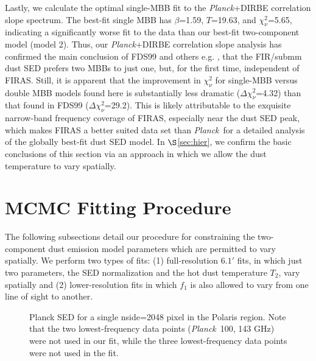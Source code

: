 \documentclass{emulateapj}
\newcommand{\PLANCK}{{\it Planck}}
\begin{document}
Lastly, we calculate the optimal single-MBB fit to the \PLANCK+DIRBE 
correlation slope spectrum. The best-fit single MBB has $\beta$=1.59, 
$T$=19.63, and $\chi^2_{\nu}$=5.65, indicating a significantly worse fit to the
data than our best-fit two-component model (model 2). Thus, our \PLANCK+DIRBE 
correlation slope analysis has confirmed the main conclusion of FDS99 and 
others e.g. \cite{reach95}, that the FIR/submm dust SED prefers two MBBs to 
just one, but, for the first time, independent of FIRAS. Still, it is apparent 
that the improvement in $\chi^2_{\nu}$ for single-MBB versus double MBB models 
found here is substantially less dramatic ($\Delta\chi^2_{\nu}$=4.32) than that
found in FDS99 ($\Delta\chi^2_{\nu}$=29.2). This is likely attributable to the 
exquisite narrow-band frequency coverage of FIRAS, especially near the dust SED
peak, which makes FIRAS a better suited data set than \PLANCK~for a detailed 
analysis of the globally best-fit dust SED model. In $\S$\ref{sec:hier}, we
confirm the basic conclusions of this section via an approach in which we 
allow the dust temperature to vary spatially.



\section{MCMC Fitting Procedure}
\label{sec:fitting}

The following subsections detail our procedure for constraining the 
two-component dust emission model parameters which are permitted to vary
spatially. We perform two types of fits: (1) full-resolution 
$6.1'$ fits, in which just two parameters, the SED normalization and the hot 
dust temperature $T_2$, vary spatially and (2) lower-resolution fits in which 
$f_1$ is also allowed to vary from one line of sight to another.

\begin{figure}
\begin{center}
\caption{\label{fig:sed} Planck SED for a single nside=2048 pixel in the 
Polaris region. Note that the two lowest-frequency data points (\PLANCK~100, 
143 GHz) were not used in our fit, while the three lowest-frequency data
points were not used in the \cite{planckdust} fit.}
\end{center}
\end{figure}
\end{document}
